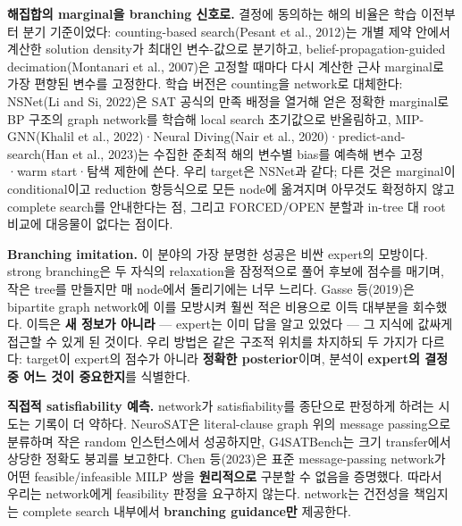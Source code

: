 \documentclass[final,5p,twocolumn]{elsarticle}
\begin{document}
\textbf{해집합의 marginal을 branching 신호로.} 결정에 동의하는 해의 비율은 학습 이전부터 분기 기준이었다: counting-based search(Pesant et al., 2012)는 개별 제약 안에서 계산한 solution density가 최대인 변수-값으로 분기하고, belief-propagation-guided decimation(Montanari et al., 2007)은 고정할 때마다 다시 계산한 근사 marginal로 가장 편향된 변수를 고정한다. 학습 버전은 counting을 network로 대체한다: NSNet(Li and Si, 2022)은 SAT 공식의 만족 배정을 열거해 얻은 정확한 marginal로 BP 구조의 graph network를 학습해 local search 초기값으로 반올림하고, MIP-GNN(Khalil et al., 2022)·Neural Diving(Nair et al., 2020)·predict-and-search(Han et al., 2023)는 수집한 준최적 해의 변수별 bias를 예측해 변수 고정·warm start·탐색 제한에 쓴다. 우리 target은 NSNet과 같다; 다른 것은 marginal이 conditional이고 reduction 항등식으로 모든 node에 옮겨지며 아무것도 확정하지 않고 complete search를 안내한다는 점, 그리고 FORCED/OPEN 분할과 in-tree 대 root 비교에 대응물이 없다는 점이다.

\textbf{Branching imitation.} 이 분야의 가장 분명한 성공은 비싼 expert의 모방이다. strong branching은 두 자식의 relaxation을 잠정적으로 풀어 후보에 점수를 매기며, 작은 tree를 만들지만 매 node에서 돌리기에는 너무 느리다. Gasse 등(2019)은 bipartite graph network에 이를 모방시켜 훨씬 적은 비용으로 이득 대부분을 회수했다. 이득은 \textbf{새 정보가 아니라} — expert는 이미 답을 알고 있었다 — 그 지식에 값싸게 접근할 수 있게 된 것이다. 우리 방법은 같은 구조적 위치를 차지하되 두 가지가 다르다: target이 expert의 점수가 아니라 \textbf{정확한 posterior}이며, 분석이 \textbf{expert의 결정 중 어느 것이 중요한지}를 식별한다.

\textbf{직접적 satisfiability 예측.} network가 satisfiability를 종단으로 판정하게 하려는 시도는 기록이 더 약하다. NeuroSAT은 literal-clause graph 위의 message passing으로 분류하며 작은 random 인스턴스에서 성공하지만, G4SATBench는 크기 transfer에서 상당한 정확도 붕괴를 보고한다. Chen 등(2023)은 표준 message-passing network가 어떤 feasible/infeasible MILP 쌍을 \textbf{원리적으로} 구분할 수 없음을 증명했다. 따라서 우리는 network에게 feasibility 판정을 요구하지 않는다. network는 건전성을 책임지는 complete search 내부에서 \textbf{branching guidance만} 제공한다.
\end{document}
